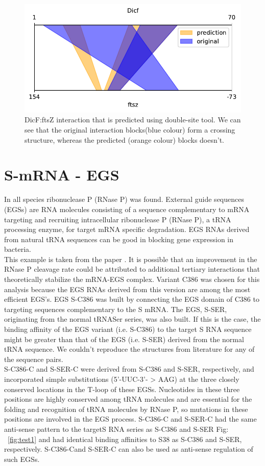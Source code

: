 \documentclass[twoside,a4paper]{report}
\numberwithin{equation}{section}
\begin{document}
\begin{figure}[h!tb]
	\centering
	\includegraphics[width=.4\linewidth]{rricomparison3}
	\caption{DicF:ftsZ interaction that is predicted using double-site tool. We can see that the original interaction blocks(blue colour) form a crossing structure, whereas the predicted (orange colour) blocks doesn't.}
	\label{fig:rricomparison3}
\end{figure}

\clearpage
	\section{S-mRNA - EGS }
	
	 In all species ribonuclease P (RNase P) was found. External guide sequences (EGSs) are RNA molecules consisting of a sequence complementary to mRNA targeting and recruiting intracellular ribonuclease P (RNase P), a tRNA processing enzyme, for target mRNA specific degradation. EGS  RNAs  derived  from  natural  tRNA sequences can be good in blocking gene expression in  bacteria.\\
	 
	 This example is taken from the paper {\citep{zhang2013engineered}}. It is possible that an improvement in the RNase P cleavage rate could be attributed to additional tertiary interactions that theoretically stabilize the mRNA-EGS complex. Variant C386 was chosen for this analysis because the EGS RNAs derived from this version are among the most efficient EGS's. EGS S-C386 was built by connecting the EGS domain of C386 to targeting sequences complementary to the S mRNA. The EGS, S-SER, originating from the normal tRNASer series, was also built. If this is the case, the binding affinity of the EGS variant (i.e. S-C386) to the target S RNA sequence might be greater than that of the EGS (i.e. S-SER) derived from the normal tRNA sequence. We couldn't reproduce the structures from literature for any of the sequence pairs.\\
	 
	 S-C386-C and S-SER-C were derived from S-C386 and S-SER, respectively, and incorporated simple substitutions (5'-UUC-3'- > AAG) at the three closely conserved locations in the T-loop of these EGSs. Nucleotides in these three positions are highly conserved among tRNA molecules and are essential for the folding and recognition of tRNA molecules by RNase P, so mutations in these positions are involved in the EGS process. S-C386-C and S-SER-C had the same anti-sense pattern to the targetS RNA series as S-C386 and S-SER Fig: ~\ref{fig:test1}  and had identical binding affinities to S38 as S-C386 and S-SER, respectively. S-C386-Cand S-SER-C can also be used as anti-sense regulation of such EGSs.\\
	   
\end{document}
